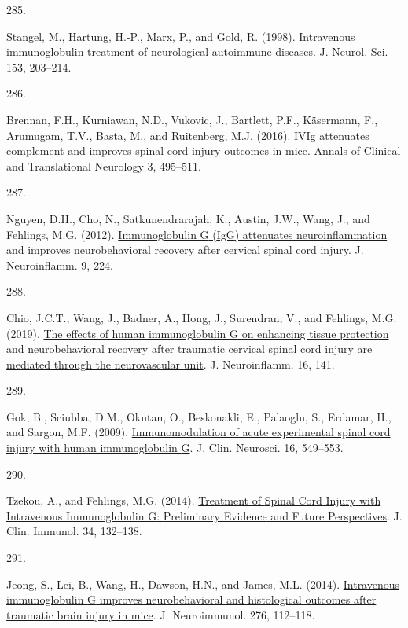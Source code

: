 \documentclass[
]{article}
\newlength{\cslhangindent}
\newlength{\csllabelwidth}
\newlength{\cslentryspacingunit} %
\newenvironment{CSLReferences}[2] %
 {%
  \setlength{\parindent}{0pt}
  \ifodd #1
  \let\oldpar\par
  \def\par{\hangindent=\cslhangindent\oldpar}
  \fi
  \setlength{\parskip}{#2\cslentryspacingunit}
 }%
 {}
\newcommand{\CSLLeftMargin}[1]{\parbox[t]{\csllabelwidth}{#1}}
\newcommand{\CSLRightInline}[1]{\parbox[t]{\linewidth - \csllabelwidth}{#1}\break}
\begin{document}
\begin{CSLReferences}{0}{0}
\leavevmode{}%
\CSLLeftMargin{285. }
\CSLRightInline{Stangel, M., Hartung, H.-P., Marx, P., and Gold, R. (1998). \href{https://doi.org/10.1016/S0022-510X(97)00292-X}{Intravenous immunoglobulin treatment of neurological autoimmune diseases}. J. Neurol. Sci. 153, 203--214.}

\leavevmode{}%
\CSLLeftMargin{286. }
\CSLRightInline{Brennan, F.H., Kurniawan, N.D., Vukovic, J., Bartlett, P.F., Käsermann, F., Arumugam, T.V., Basta, M., and Ruitenberg, M.J. (2016). \href{https://doi.org/10.1002/acn3.318}{{IVIg} attenuates complement and improves spinal cord injury outcomes in mice}. Annals of Clinical and Translational Neurology 3, 495--511.}

\leavevmode{}%
\CSLLeftMargin{287. }
\CSLRightInline{Nguyen, D.H., Cho, N., Satkunendrarajah, K., Austin, J.W., Wang, J., and Fehlings, M.G. (2012). \href{https://doi.org/10.1186/1742-2094-9-224}{Immunoglobulin {G} ({IgG}) attenuates neuroinflammation and improves neurobehavioral recovery after cervical spinal cord injury}. J. Neuroinflamm. 9, 224.}

\leavevmode{}%
\CSLLeftMargin{288. }
\CSLRightInline{Chio, J.C.T., Wang, J., Badner, A., Hong, J., Surendran, V., and Fehlings, M.G. (2019). \href{https://doi.org/10.1186/s12974-019-1518-0}{The effects of human immunoglobulin {G} on enhancing tissue protection and neurobehavioral recovery after traumatic cervical spinal cord injury are mediated through the neurovascular unit}. J. Neuroinflamm. 16, 141.}

\leavevmode{}%
\CSLLeftMargin{289. }
\CSLRightInline{Gok, B., Sciubba, D.M., Okutan, O., Beskonakli, E., Palaoglu, S., Erdamar, H., and Sargon, M.F. (2009). \href{https://doi.org/10.1016/j.jocn.2008.04.024}{Immunomodulation of acute experimental spinal cord injury with human immunoglobulin {G}}. J. Clin. Neurosci. 16, 549--553.}

\leavevmode{}%
\CSLLeftMargin{290. }
\CSLRightInline{Tzekou, A., and Fehlings, M.G. (2014). \href{https://doi.org/10.1007/s10875-014-0021-8}{Treatment of {Spinal Cord Injury} with {Intravenous Immunoglobulin G}: {Preliminary Evidence} and {Future Perspectives}}. J. Clin. Immunol. 34, 132--138.}

\leavevmode{}%
\CSLLeftMargin{291. }
\CSLRightInline{Jeong, S., Lei, B., Wang, H., Dawson, H.N., and James, M.L. (2014). \href{https://doi.org/10.1016/j.jneuroim.2014.08.626}{Intravenous immunoglobulin {G} improves neurobehavioral and histological outcomes after traumatic brain injury in mice}. J. Neuroimmunol. 276, 112--118.}


\end{CSLReferences}
\end{document}
